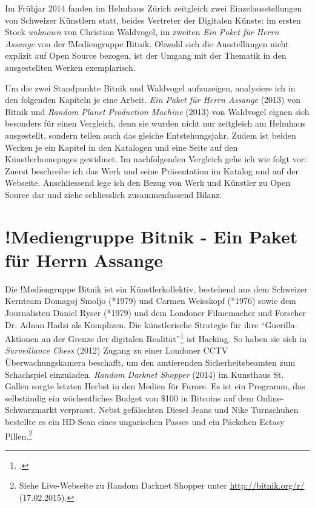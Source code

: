\documentclass[
paper=164mm:234mm, %
pagesize, %
DIV=calc, %
10pt, %
BCOR=0mm, %
parskip=half- %
]{scrbook}
\begin{document}
Im Frühjar 2014 fanden im Helmhaus Zürich zeitgleich zwei Einzelausstellungen von Schweizer Künstlern statt, beides Vertreter der Digitalen Künste: im ersten Stock \emph{unknown} von Christian Waldvogel, im zweiten \emph{Ein Paket für Herrn Assange} von der !Mediengruppe Bitnik. Obwohl sich die Ausstellungen nicht explizit auf Open Source bezogen, ist der Umgang mit der Thematik in den ausgestellten Werken exemplarisch.

Um die zwei Standpunkte Bitnik und Waldvogel aufzuzeigen, analysiere ich in den folgenden Kapiteln je eine Arbeit. \emph{Ein Paket für Herrn Assange} (2013) von Bitnik und \emph{Random Planet Production Machine} (2013) von Waldvogel eignen sich besonders für einen Vergleich, denn sie wurden nicht nur zeitgleich am Helmhaus ausgestellt, sondern teilen auch das gleiche Entstehungsjahr. Zudem ist beiden Werken je ein Kapitel in den Katalogen und eine Seite auf den Künstlerhomepages gewidmet. Im nachfolgenden Vergleich gehe ich wie folgt vor: Zuerst beschreibe ich das Werk und seine Präsentation im Katalog und auf der Webseite. Anschliessend lege ich den Bezug von Werk und Künstler zu Open Source dar und ziehe schliesslich zusammenfassend Bilanz.

{}
\section*{!Mediengruppe Bitnik - Ein Paket für Herrn Assange}

Die !Mediengruppe Bitnik ist ein Künstlerkollektiv, bestehend aus dem Schweizer Kernteam Domagoj Smoljo (*1979) und Carmen Weisskopf (*1976) sowie dem Journalisten Daniel Ryser (*1979) und dem Londoner Filmemacher und Forscher Dr. Adnan Hadzi als Komplizen. Die künstlerische Strategie für ihre \enquote{Guerilla-Aktionen an der Grenze der digitalen Realität}\footnote{\cite{Diener:2013}.} ist Hacking. So haben sie sich in \emph{Surveillance Chess} (2012) Zugang zu einer Londoner CCTV Überwachungskamera beschafft, um den amtierenden Sicherheitsbeamten zum Schachspiel einzuladen. \emph{Random Darknet Shopper} (2014) im Kunsthaus St. Gallen sorgte  letzten Herbst in den Medien für Furore. Es ist ein Programm, das selbständig ein wöchentliches Budget von \$100 in Bitcoins auf dem Online-Schwarzmarkt verprasst. Nebst gefälschten Diesel Jeans und Nike Turnschuhen bestellte es ein HD-Scan eines ungarischen Passes und ein Päckchen Ectasy Pillen.\footnote{Siehe Live-Webseite zu Random Darknet Shopper unter \url{http://bitnik.org/r/} (17.02.2015).}
\end{document}
